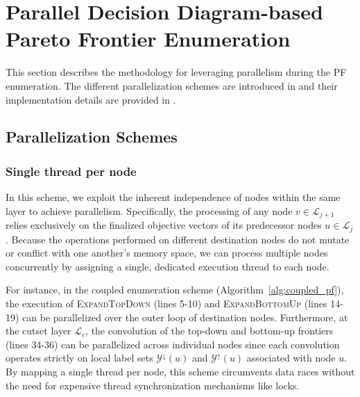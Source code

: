 \documentclass[letterpaper]{article}
\begin{document}
\section{Parallel Decision Diagram-based Pareto Frontier Enumeration}
\label{sec:method}

This section describes the methodology for leveraging parallelism during the PF enumeration. The different parallelization schemes are introduced in  and their implementation details are provided in .

\subsection{Parallelization Schemes}
\label{sec:parallel_schemes}

\subsubsection{Single thread per node}
In this scheme, we exploit the inherent independence of nodes within the same layer to achieve parallelism. Specifically, the processing of any node $v \in \mathcal{L}_{j+1}$ relies exclusively on the finalized objective vectors of its predecessor nodes $u \in \mathcal{L}_j$. Because the operations performed on different destination nodes do not mutate or conflict with one another's memory space, we can process multiple nodes concurrently by assigning a single, dedicated execution thread to each node.

For instance, in the coupled enumeration scheme (Algorithm~\ref{alg:coupled_pf}), the execution of \textsc{ExpandTopDown} (lines 5-10) and \textsc{ExpandBottomUp} (lines 14-19) can be parallelized over the outer loop of destination nodes.
Furthermore, at the cutset layer $\mathcal{L}_c$, the convolution of the top-down and bottom-up frontiers (lines 34-36) can be parallelized across individual nodes since each convolution operates strictly on local label sets $\mathcal{Y}^{\downarrow}(u)$ and $\mathcal{Y}^{\uparrow}(u)$ associated with node $u$.
By mapping a single thread per node, this scheme circumvents data races without the need for expensive thread synchronization mechanisms like locks.
\end{document}
